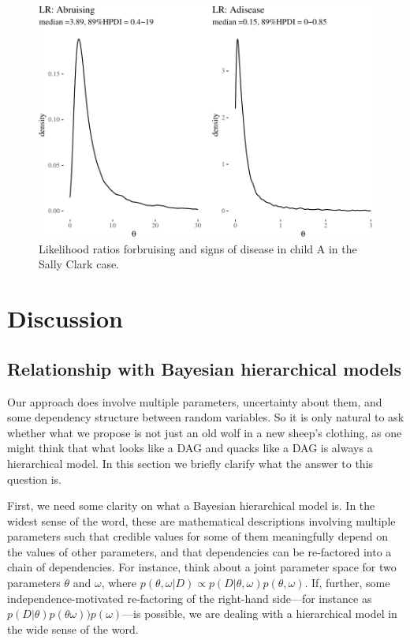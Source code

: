 \documentclass[
  10pt,
  dvipsnames,enabledeprecatedfontcommands]{scrartcl}
\begin{document}
\begin{figure}[H]


\begin{center}\includegraphics[width=0.9\linewidth]{imprecision_philosophical_paper2_files/figure-latex/SClrs-1} \end{center}

\caption{Likelihood ratios forbruising and signs of disease in child A in the Sally Clark case.}
\label{fig:SClrs}

\end{figure}

\section{Discussion}\label{discussion}

\subsection{Relationship with Bayesian hierarchical
models}\label{relationship-with-bayesian-hierarchical-models}

Our approach does involve multiple parameters, uncertainty about them,
and some dependency structure between random variables. So it is only
natural to ask whether what we propose is not just an old wolf in a new
sheep's clothing, as one might think that what looks like a DAG and
quacks like a DAG is always a hierarchical model. In this section we
briefly clarify what the answer to this question is.

First, we need some clarity on what a Bayesian hierarchical model is. In
the widest sense of the word, these are mathematical descriptions
involving multiple parameters such that credible values for some of them
meaningfully depend on the values of other parameters, and that
dependencies can be re-factored into a chain of dependencies. For
instance, think about a joint parameter space for two parameters
\(\theta\) and \(\omega\), where
\(p(\theta, \omega \vert D) \propto p(D \vert \theta, \omega)p(\theta, \omega)\).
If, further, some independence-motivated re-factoring of the right-hand
side---for instance as
\(p(D\vert \theta)p(\theta \omega)) p (\omega)\)---is possible, we are
dealing with a hierarchical model in the wide sense of the word.
\end{document}
